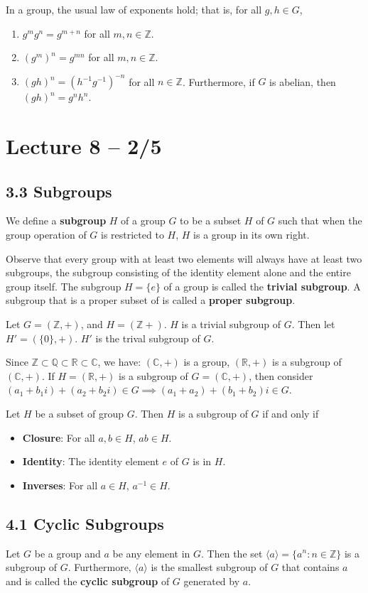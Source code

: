 \documentclass{article}
\newcommand{\R}{\mathbb{R}}
\newcommand{\Z}{\mathbb{Z}}
\newcommand{\Q}{\mathbb{Q}}
\newcommand{\C}{\mathbb{C}}
\begin{document}
\begin{theorem}
  In a group, the usual law of exponents hold; that is, for all $g,h\in G$,
  \begin{enumerate}
    \item $g^mg^n=g^{m+n}$ for all $m,n\in\Z$.
    \item $(g^m)^n=g^{mn}$ for all $m,n\in\Z$.
    \item $(gh)^n=(h^{-1}g^{-1})^{-n}$ for all $n\in\Z$. Furthermore, if $G$ is abelian, then $(gh)^n=g^nh^n$.
  \end{enumerate}
\end{theorem}

\section{Lecture 8 -- 2/5}
\subsection{3.3 Subgroups}
We define a \textbf{subgroup} $H$ of a group $G$ to be a subset $H$ of $G$ such that when the group operation of $G$ is restricted to $H$, $H$ is a group in its own right.

Observe that every group with at least two elements will always have at least two subgroups, the subgroup consisting of the identity element alone and the entire group itself. The subgroup $H = \{e\}$ of a group is called the \textbf{trivial subgroup}. A subgroup that is a proper subset of is called a \textbf{proper subgroup}.
\begin{example}
  Let $G=(\Z,+)$, and $H=(\Z+).$ $H$ is a trivial subgroup of $G$. Then let $H'=(\{0\},+).$ $H'$ is the trival subgroup of $G$.
\end{example}
Since $\Z\subset\Q\subset\R\subset\C$, we have: $(\C,+)$ is a group, $(\R,+)$ is a subgroup of $(\C,+)$. If $H=(\R,+)$ is a subgroup of $G=(\C,+)$, then consider $(a_1+b_1i) + (a_2+b_2i) \in G \implies (a_1+a_2)+(b_1+b_2)i\in G.$

Let $H$ be a subset of group $G$. Then $H$ is a subgroup of $G$ if and only if
\begin{itemize}
  \item \textbf{Closure}: For all $a,b\in H$, $ab\in H$.
  \item \textbf{Identity}: The identity element $e$ of $G$ is in $H$.
  \item \textbf{Inverses}: For all $a\in H$, $a^{-1}\in H$.
\end{itemize}
\subsection{4.1 Cyclic Subgroups}
\begin{theorem}
  Let $G$ be a group and $a$ be any element in $G$. Then the set $\langle a \rangle = \{a^n:n\in \Z\}$ is a subgroup of $G$. Furthermore, $\langle a \rangle$ is the smallest subgroup of $G$ that contains $a$ and is called the \textbf{cyclic subgroup} of $G$ generated by $a$.
\end{theorem}
\end{document}
